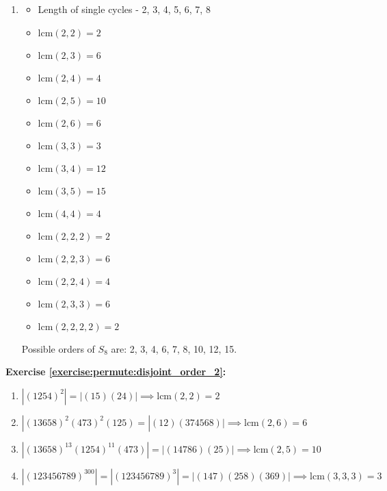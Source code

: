 \begin{enumerate}[{a.}]
\item
\begin{multicols}{2}
	\begin{itemize}
	\item
	Length of single cycles - 2, 3, 4, 5, 6, 7, 8
	
	\item
	$\mbox{lcm}(2, 2) = 2$
	
	\item
	$\mbox{lcm}(2, 3) = 6$
	
	\item
	$\mbox{lcm}(2, 4) = 4$
	
	\item
	$\mbox{lcm}(2, 5) = 10$
	
	\item
	$\mbox{lcm}(2, 6) = 6$
	
	\item
	$\mbox{lcm}(3, 3) = 3$
	
	\item
	$\mbox{lcm}(3, 4) = 12$
	
	\item
	$\mbox{lcm}(3, 5) = 15$
	
	\item
	$\mbox{lcm}(4, 4) = 4$
	
	\item
	$\mbox{lcm}(2, 2, 2) = 2$
	
	\item
	$\mbox{lcm}(2, 2, 3) = 6$
	
	\item
	$\mbox{lcm}(2, 2, 4) = 4$
	
	\item
	$\mbox{lcm}(2, 3, 3) = 6$
	
	\item
	$\mbox{lcm}(2, 2, 2, 2) = 2$
	\end{itemize}
	\end{multicols}
Possible orders of $S_8$ are: 2, 3, 4, 6, 7, 8, 10, 12, 15.
\end{enumerate}

\noindent\textbf{Exercise \ref{exercise:permute:disjoint_order_2}:}
\begin{enumerate}[{a.}]
\item
$|(1254)^2| = |(15)(24)| \implies \mbox{lcm}(2, 2) = 2$ 

\item
$|(13658)^2(473)^2(125) = |(12)(374568)| \implies \mbox{lcm}(2, 6) = 6$

\item
$|(13658)^{13}(1254)^{11}(473)| = |(14786)(25)| \implies \mbox{lcm}(2, 5) = 10$

\item
$|(123456789)^{300}| = |(123456789)^3| = |(147)(258)(369)| \implies \mbox{lcm}(3, 3, 3) = 3$
\end{enumerate}

